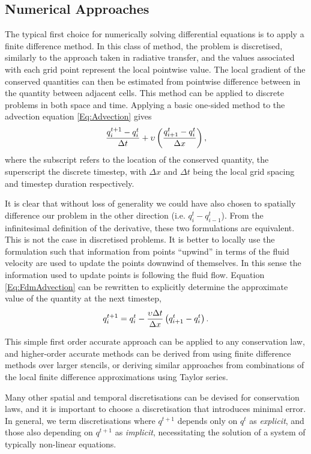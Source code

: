 \subsection{Numerical Approaches}

The typical first choice for numerically solving differential equations is to apply a finite difference method.
In this class of method, the problem is discretised, similarly to the approach taken in radiative transfer, and the values associated with each grid point represent the local pointwise value.
The local gradient of the conserved quantities can then be estimated from pointwise difference between in the quantity between adjacent cells.
This method can be applied to discrete problems in both space and time.
Applying a basic one-sided method to the advection equation \eqref{Eq:Advection} gives
\begin{equation}\label{Eq:FdmAdvection}
    \frac{q^{t+1}_i - q^t_i}{\Delta t} + \upsilon \left( \frac{q^t_{i+1} - q^t_i}{\Delta x} \right),
\end{equation}
where the subscript refers to the location of the conserved quantity, the superscript the discrete timestep, with $\Delta x$ and $\Delta t$ being the local grid spacing and timestep duration respectively.

It is clear that without loss of generality we could have also chosen to spatially difference our problem in the other direction (i.e. $q^t_i - q^t_{i-1}$).
From the infinitesimal definition of the derivative, these two formulations are equivalent.
This is not the case in discretised problems.
It is better to locally use the formulation such that information from points ``upwind'' in terms of the fluid velocity are used to update the points downwind of themselves.
In this sense the information used to update points is following the fluid flow.
Equation \eqref{Eq:FdmAdvection} can be rewritten to explicitly determine the approximate value of the quantity at the next timestep,
\begin{equation}
    q^{t+1}_i = q^t_i - \frac{\upsilon \Delta t}{\Delta x}\left( q^t_{i+1} - q^t_i \right).
\end{equation}

This simple first order accurate approach can be applied to any conservation law, and higher-order accurate methods can be derived from using finite difference methods over larger stencils, or deriving similar approaches from combinations of the local finite difference approximations using Taylor series.

Many other spatial and temporal discretisations can be devised for conservation laws, and it is important to choose a discretisation that introduces minimal error.
In general, we term discretisations where $q^{t+1}$ depends only on $q^{t}$ as \emph{explicit}, and those also depending on $q^{t+1}$ as \emph{implicit}, necessitating the solution of a system of typically non-linear equations.

